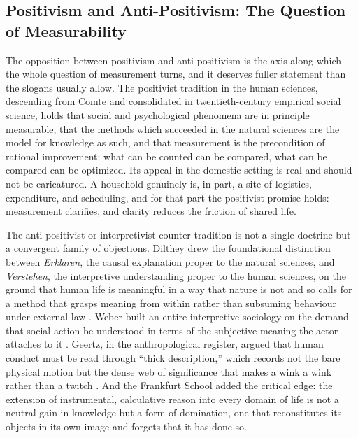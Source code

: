 \subsection{Positivism and Anti-Positivism: The Question of Measurability}\label{p01:sec:posneg}

The opposition between positivism and anti-positivism is the axis along which the whole question of measurement turns, and it deserves fuller statement than the slogans usually allow. The positivist tradition in the human sciences, descending from Comte and consolidated in twentieth-century empirical social science, holds that social and psychological phenomena are in principle measurable, that the methods which succeeded in the natural sciences are the model for knowledge as such, and that measurement is the precondition of rational improvement: what can be counted can be compared, what can be compared can be optimized. Its appeal in the domestic setting is real and should not be caricatured. A household genuinely is, in part, a site of logistics, expenditure, and scheduling, and for that part the positivist promise holds: measurement clarifies, and clarity reduces the friction of shared life.

The anti-positivist or interpretivist counter-tradition is not a single doctrine but a convergent family of objections. Dilthey drew the foundational distinction between \emph{Erklären}, the causal explanation proper to the natural sciences, and \emph{Verstehen}, the interpretive understanding proper to the human sciences, on the ground that human life is meaningful in a way that nature is not and so calls for a method that grasps meaning from within rather than subsuming behaviour under external law \parencite{dilthey1989introduction}. Weber built an entire interpretive sociology on the demand that social action be understood in terms of the subjective meaning the actor attaches to it \parencite{weber1978economy}. Geertz, in the anthropological register, argued that human conduct must be read through ``thick description,'' which records not the bare physical motion but the dense web of significance that makes a wink a wink rather than a twitch \parencite{geertz1973interpretation}. And the Frankfurt School added the critical edge: the extension of instrumental, calculative reason into every domain of life is not a neutral gain in knowledge but a form of domination, one that reconstitutes its objects in its own image and forgets that it has done so.


